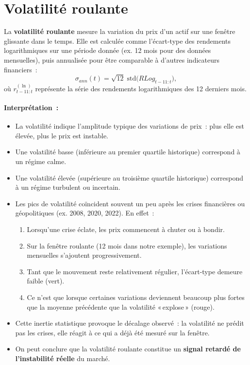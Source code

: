 \documentclass[12pt,a4paper]{article}
\begin{document}
\section{Volatilité roulante}

La \textbf{volatilité roulante} mesure la variation du prix d'un actif sur une 
fenêtre glissante dans le temps. Elle est calculée comme l'écart-type des 
rendements logarithmiques sur une période donnée (ex. 12 mois pour des données 
mensuelles), puis annualisée pour être comparable à d'autres indicateurs financiers~:
\begin{equation}
    \sigma_{ann}(t) = \sqrt{12}\; \mathrm{std} \bigl(RLog_{t-11:t}\bigr),
\end{equation}
où $r_{t-11:t}^{(\ln)}$ représente la série des rendements logarithmiques des 12 
derniers mois.

\paragraph{Interprétation~:}
\begin{itemize}
    \item La volatilité indique l'amplitude typique des variations de prix~: 
          plus elle est élevée, plus le prix est instable.
    \item Une volatilité basse (inférieure au premier quartile historique) 
          correspond à un régime calme.
    \item Une volatilité élevée (supérieure au troisième quartile historique) 
          correspond à un régime turbulent ou incertain.
    \item Les pics de volatilité coïncident souvent un peu après les crises financières 
          ou géopolitiques (ex. 2008, 2020, 2022).  
          En effet~:
          \begin{enumerate}
              \item Lorsqu'une crise éclate, les prix commencent à chuter ou à bondir.
              \item Sur la fenêtre roulante (12 mois dans notre exemple), les variations
                    mensuelles s'ajoutent progressivement.
              \item Tant que le mouvement reste relativement régulier, l'écart-type
                    demeure faible (vert).
              \item Ce n'est que lorsque certaines variations deviennent beaucoup plus
                    fortes que la moyenne précédente que la volatilité « explose »
                    (rouge).
          \end{enumerate}
    \item Cette inertie statistique provoque le décalage observé : la volatilité ne prédit
          pas les crises, elle réagit à ce qui a déjà été mesuré sur la fenêtre.
    \item On peut conclure que la volatilité roulante constitue un 
          \textbf{signal retardé de l'instabilité réelle} du marché.
\end{itemize}
\end{document}
